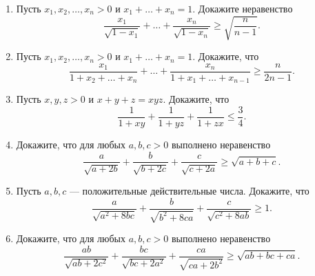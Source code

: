 \documentclass[a4paper,12pt,leqno]{article}
\begin{document}
\begin{enumerate}
		\item[\z] Пусть $x_1, x_2, \dots, x_n > 0$ и $x_1+\dots +x_n=1$. Докажите неравенство
		$$\frac{x_1}{\sqrt{1-x_1}} + \dots + \frac{x_n}{\sqrt{1-x_n}} \geqslant \sqrt{\frac{n}{n-1}}.$$  
		

		\item[\z] Пусть $x_1, x_2, \dots, x_n > 0$ и $x_1+\dots +x_n=1$. Докажите, что 
		$$\frac{x_1}{1+x_2+\dots +x_n} + \dots +\frac{x_n}{1  + x_1+ \dots+ x_{n-1}} \geqslant \frac{n}{2n-1}.$$
		
		\item[\z] Пусть $x, y, z > 0$ и $x+y+z=xyz$. Докажите, что
		$$\frac{1}{1+xy} + \frac{1}{1+yz} + \frac{1}{1+zx} \leqslant \frac{3}{4}.$$ 
		
		\item[\z] Докажите, что для любых $a, b, c > 0$ выполнено неравенство 
		$$\frac{a}{\sqrt{a+2b}} + \frac{b}{\sqrt{b+2c}} + \frac{c}{\sqrt{c+2a}} \geqslant \sqrt{a+b+c}.$$ 
		
		\item[\z] Пусть $a, b, c$ --- положительные действительные числа. Докажите, что 
		$$\frac{a}{\sqrt{a^2+8bc}} + \frac{b}{\sqrt{b^2+8ca}} + \frac{c}{\sqrt{c^2+8ab}} \geqslant 1.$$ 

		\item[\z] Докажите, что для любых $a, b, c > 0$ выполнено неравенство 
		$$\frac{ab}{\sqrt{ab+2c^2}} + \frac{bc}{\sqrt{bc + 2a^2}} + \frac{ca}{\sqrt{ca +2b^2}} \geqslant \sqrt{ab+bc+ca}.$$ 
	\end{enumerate}
\end{document}
